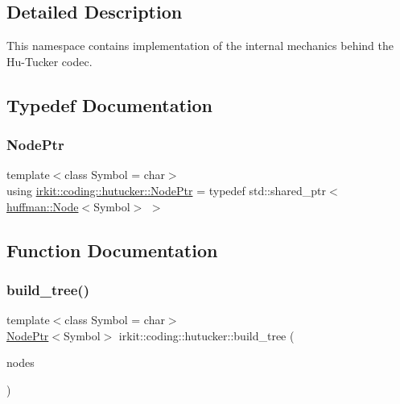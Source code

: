 \subsection{Detailed Description}
This namespace contains implementation of the internal mechanics behind the Hu-\/\+Tucker codec. 

\subsection{Typedef Documentation}
\mbox{\label{namespaceirkit_1_1coding_1_1hutucker_a3fd5bcbd5c6d608f75e0afbb7f171899}} 
\subsubsection{\texorpdfstring{Node\+Ptr}{NodePtr}}
{\footnotesize\ttfamily template$<$class Symbol  = char$>$ \\
using \mbox{\hyperlink{namespaceirkit_1_1coding_1_1hutucker_a3fd5bcbd5c6d608f75e0afbb7f171899}{irkit\+::coding\+::hutucker\+::\+Node\+Ptr}} = typedef std\+::shared\+\_\+ptr$<$\mbox{\hyperlink{structirkit_1_1coding_1_1huffman_1_1Node}{huffman\+::\+Node}}$<$Symbol$>$ $>$}



\subsection{Function Documentation}
\mbox{\label{namespaceirkit_1_1coding_1_1hutucker_a77fa0b99ad3161c99f17821181e0025d}} 
\subsubsection{\texorpdfstring{build\+\_\+tree()}{build\_tree()}}
{\footnotesize\ttfamily template$<$class Symbol  = char$>$ \\
\mbox{\hyperlink{namespaceirkit_1_1coding_1_1hutucker_a3fd5bcbd5c6d608f75e0afbb7f171899}{Node\+Ptr}}$<$Symbol$>$ irkit\+::coding\+::hutucker\+::build\+\_\+tree (\begin{DoxyParamCaption}\item[{std\+::list$<$ \mbox{\hyperlink{namespaceirkit_1_1coding_1_1hutucker_a3fd5bcbd5c6d608f75e0afbb7f171899}{Node\+Ptr}}$<$ Symbol $>$$>$ \&}]{nodes }\end{DoxyParamCaption})}

